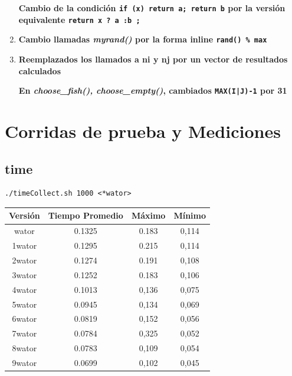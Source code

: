 \documentclass[a4paper,10pt]{article}
\begin{document}
\begin{enumerate}
	\textbf{Cambio de la condici\'on \texttt{if (x) return a; return b} por la versi\'on equivalente \texttt{return x ? a :b ;}}
   
 \item  \textbf{Cambio llamadas \textit{myrand()} por la forma inline \texttt{rand() \% max}}
 
 \item \textbf{Reemplazados los llamados a ni y nj por un vector de resultados calculados}

	\textbf{En \textit{choose\_fish(), choose\_empty()}, cambiados \texttt{MAX(I|J)-1} por 31 }
    

\end{enumerate}

\newpage

\section{Corridas de prueba y Mediciones}

\subsection{time}

\begin{verbatim}
./timeCollect.sh 1000 <*wator>
\end{verbatim}

\begin{center}
  \begin{tabular}{| c | c | c | c | }
    \hline
    Versi\'on 	&	Tiempo Promedio	& 	M\'aximo 	& 	M\'inimo	\\ \hline
\hline
    wator	&	0.1325		&       0.183		&	0,114		\\ \hline
    1wator	&	0.1295		&   	0.215		&	0,114		\\ \hline
    2wator	&	0.1274		&	0.191		&	0,108		\\ \hline
    3wator	&	0.1252		&	0.183		&	0,106		\\ \hline
    4wator	&	0.1013		&	0,136		&	0,075		\\ \hline
    5wator	&	0.0945		&	0,134		&	0,069		\\ \hline
    6wator	&	0.0819		&	0,152		&	0,056		\\ \hline
    7wator	&	0.0784		&	0,325		&	0,052		\\ \hline
    8wator	&	0.0783		&	0,109		&	0,054		\\ \hline
    9wator	&	0.0699		&	0,102		&	0,045		\\ \hline
  \end{tabular}
\end{center}
\end{document}
